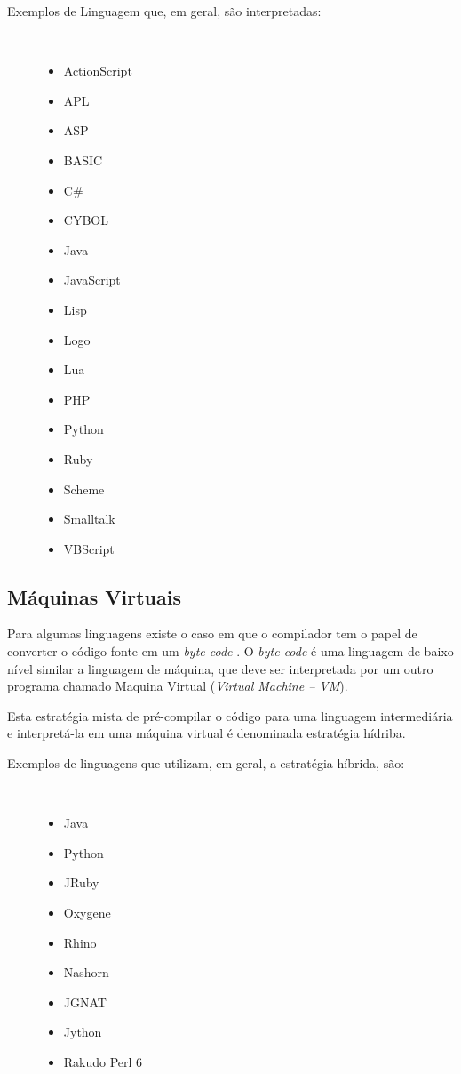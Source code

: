 \begin{description}
    \item[Exemplos de Linguagem que, em geral, são interpretadas:]\
    \begin{itemize}
        \item ActionScript
        \item APL
        \item ASP
        \item BASIC
        \item C\#
        \item CYBOL
        \item Java
        \item JavaScript
        \item Lisp
        \item Logo
        \item Lua
        \item PHP
        \item Python
        \item Ruby
        \item Scheme
        \item Smalltalk
        \item VBScript
    \end{itemize}
\end{description}

\subsection{Máquinas Virtuais}

Para algumas linguagens existe o caso em que o compilador tem o papel
 de converter o código fonte em um \textit{byte code} \cite{ref9}. 
O \textit{byte code}
é uma linguagem de baixo nível  similar a linguagem de máquina, que 
deve ser interpretada por um outro programa chamado Maquina Virtual (\textit{Virtual Machine -- VM}).

Esta estratégia mista de pré-compilar o código para uma linguagem 
intermediária e interpretá-la em uma máquina virtual é denominada 
estratégia hídriba. 

\begin{description}
    \item[Exemplos de linguagens que utilizam, em geral, 
          a estratégia híbrida, são:]\
    \begin{itemize}
        \item Java  
        \item Python
        \item JRuby
        \item Oxygene
        \item Rhino
        \item Nashorn
        \item JGNAT
        \item Jython
        \item Rakudo Perl 6
    \end{itemize}
\end{description}

